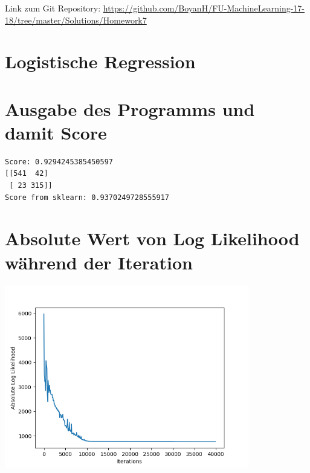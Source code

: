 \usepackage{graphicx}
\usepackage{amsmath}
\usepackage{amssymb}
\usepackage{fancyvrb}

\newcommand{\dozent}{Prof. R. Rojas}					%
\newcommand{\projectNo}{7}
\newcommand{\veranstaltung}{Mustererkennung}
\newcommand{\semester}{WS17/18}
\newcommand{\studenten}{Boyan Hristov, Nedeltscho Petrov}





Link zum Git Repository: \url{https://github.com/BoyanH/FU-MachineLearning-17-18/tree/master/Solutions/Homework\projectNo}

\section*{Logistische Regression}

\section*{Ausgabe des Programms und damit Score}

\begin{lstlisting}
Score: 0.9294245385450597
[[541  42]
 [ 23 315]]
Score from sklearn: 0.9370249728555917
\end{lstlisting}

\section*{Absolute Wert von Log Likelihood während der Iteration}
\includegraphics[height=8cm]{./ll_over_time.png}

